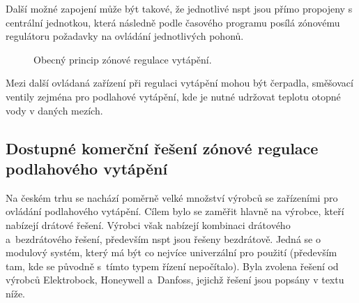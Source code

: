 Další možné zapojení může být takové, že jednotlivé \acrshort{nspt} jsou přímo propojeny s centrální jednotkou, která následně podle časového programu posílá zónovému regulátoru požadavky na ovládání jednotlivých pohonů. 


\begin{figure}[H]
    \centering
    \def\svgwidth{0.8\columnwidth}
    
    \caption{Obecný princip zónové regulace vytápění.}
    \label{fig:obecny-princip-zonove-regulace}
\end{figure}

Mezi další ovládaná zařízení při regulaci vytápění mohou být čerpadla, směšovací ventily zejména pro podlahové vytápění, kde je nutné udržovat teplotu otopné vody v daných mezích.

\subsection{Dostupné komerční řešení zónové regulace podlahového vytápění}


Na českém trhu se nachází poměrně velké množství výrobců se zařízeními pro ovládání podlahového vytápění. Cílem bylo se zaměřit hlavně na výrobce, kteří nabízejí drátové řešení. Výrobci však nabízejí kombinaci drátového a~bezdrátového řešení, především \acrshort{nspt} jsou řešeny bezdrátově. Jedná se o modulový systém, který má být co nejvíce univerzální pro použití (především tam, kde se původně s~tímto typem řízení nepočítalo). Byla zvolena řešení od výrobců Elektrobock, Honeywell a~Danfoss, jejichž řešení jsou popsány v textu níže.



